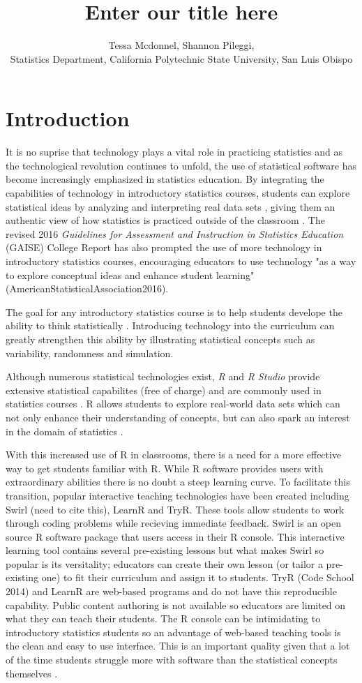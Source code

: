\documentclass{tise_style}
\title{Enter our title here}
\author{Tessa Mcdonnel, Shannon Pileggi,  \\Statistics Department, California Polytechnic State University, San Luis Obispo}
\begin{document}
\section{Introduction}

It is no suprise that technology plays a vital role in practicing statistics and as the technological revolution continues to 
unfold, the use of statistical software has become increasingly emphasized in statistics education. By integrating the 
capabilities of technology in introductory statistics courses, students can explore statistical ideas by analyzing and 
interpreting real data sets \citep{Chance2007}, giving them an authentic view of how statistics is practiced outside of the 
classroom \citep{Wang2017}. The revised 2016 \textit{Guidelines for Assessment and Instruction in Statistics Education} 
(GAISE) College Report has also prompted the use of more technology in introductory statistics courses, encouraging educators 
to use technology "as a way to explore conceptual ideas and enhance student learning" (AmericanStatisticalAssociation2016).

The goal for any introductory statistics course is to help students develope the ability to think statistically 
\citep{AmericanStatisticalAssociation2016}. 
Introducing technology into the curriculum can greatly strengthen this ability by illustrating statistical concepts such as
variability, randomness and simulation.

Although numerous statistical technologies exist, \textit{R} and \textit{R Studio} provide extensive statistical capabilites 
(free of charge) and are commonly used in statistics courses \citep{Chance2007}. R allows students to explore real-world data 
sets which can not only enhance their understanding of concepts, but can also spark an interest in the domain of statistics 
\citep{Wang2017}.

With this increased use of R in classrooms, there is a need for a more effective way to get students familiar with R. While R
software provides users with extraordinary abilities there is no doubt a steep learning curve. To facilitate this transition,
popular interactive teaching technologies have been created including Swirl (need to cite this), LearnR and TryR. These tools 
allow students to work through coding problems while recieving immediate feedback. Swirl is an open source R software package 
that users access in their R console. This interactive learning tool contains several pre-existing lessons but what makes 
Swirl so popular is its versitality; educators can create their own lesson (or tailor a pre-existing one) to fit their 
curriculum and assign it to students. TryR (Code School 2014) and LearnR are web-based programs and do not have this 
reproducible capability. Public content authoring is not available so educators are limited on what they can teach their 
students. The R console can be intimidating to introductory statistics students so an advantage of web-based teaching tools is 
the clean and easy to use interface. This is an important quality given that a lot of the time students struggle more with 
software than the statistical concepts themselves \citep{Hare2017}.  
\end{document}
